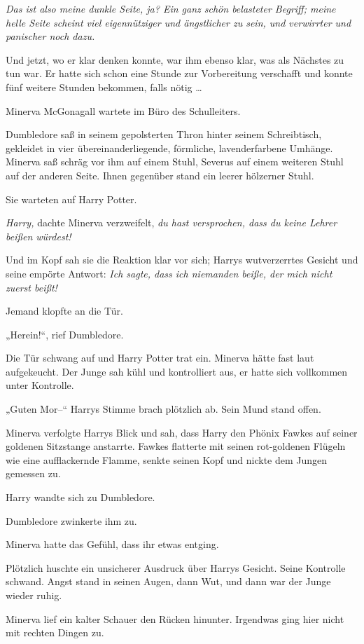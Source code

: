 \emph{Das ist also meine dunkle Seite, ja? Ein ganz schön belasteter Begriff; meine helle Seite scheint viel eigennütziger und ängstlicher zu sein, und verwirrter und panischer noch dazu.} 

Und jetzt, wo er klar denken konnte, war ihm ebenso klar, was als Nächstes zu tun war. Er hatte sich schon eine Stunde zur Vorbereitung verschafft und konnte fünf weitere Stunden bekommen, falls nötig … 

\later 

Minerva McGonagall wartete im Büro des Schulleiters. 

Dumbledore saß in seinem gepolsterten Thron hinter seinem Schreibtisch, gekleidet in vier übereinanderliegende, förmliche, lavenderfarbene Umhänge. Minerva saß schräg vor ihm auf einem Stuhl, Severus auf einem weiteren Stuhl auf der anderen Seite. Ihnen gegenüber stand ein leerer hölzerner Stuhl. 

Sie warteten auf Harry Potter. 

\emph{Harry,} dachte Minerva verzweifelt, \emph{du hast versprochen, dass du keine Lehrer beißen würdest!} 

Und im Kopf sah sie die Reaktion klar vor sich; Harrys wutverzerrtes Gesicht und seine empörte Antwort: \emph{Ich sagte, dass ich niemanden beiße, der mich nicht zuerst beißt!} 

Jemand klopfte an die Tür. 

„Herein!“, rief Dumbledore. 

Die Tür schwang auf und Harry Potter trat ein. Minerva hätte fast laut aufgekeucht. Der Junge sah kühl und kontrolliert aus, er hatte sich vollkommen unter Kontrolle. 

„Guten Mor–“ Harrys Stimme brach plötzlich ab. Sein Mund stand offen. 

Minerva verfolgte Harrys Blick und sah, dass Harry den Phönix Fawkes auf seiner goldenen Sitzstange anstarrte. Fawkes flatterte mit seinen rot-goldenen Flügeln wie eine aufflackernde Flamme, senkte seinen Kopf und nickte dem Jungen gemessen zu. 

Harry wandte sich zu Dumbledore. 

Dumbledore zwinkerte ihm zu. 

Minerva hatte das Gefühl, dass ihr etwas entging. 

Plötzlich huschte ein unsicherer Ausdruck über Harrys Gesicht. Seine Kontrolle schwand. Angst stand in seinen Augen, dann Wut, und dann war der Junge wieder ruhig. 

Minerva lief ein kalter Schauer den Rücken hinunter. Irgendwas ging hier nicht mit rechten Dingen zu. 

